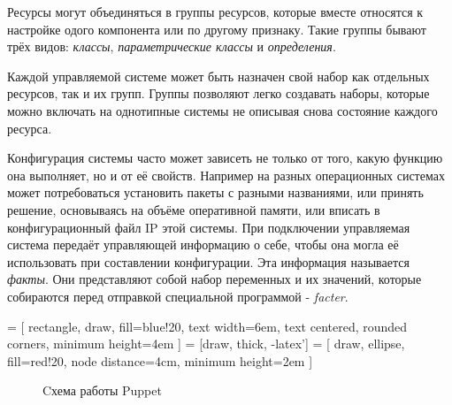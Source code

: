 Ресурсы могут объединяться в группы ресурсов, которые вместе относятся к настройке одого компонента или по другому признаку. Такие группы бывают трёх видов: \emph{классы}, \emph{параметрические классы} и \emph{определения}.

Каждой управляемой системе может быть назначен свой набор как отдельных ресурсов, так и их групп. Группы позволяют легко создавать наборы, которые можно включать на однотипные системы не описывая снова состояние каждого ресурса.

Конфигурация системы часто может зависеть не только от того, какую функцию она выполняет, но и от её свойств. Например на разных операционных системах может потребоваться установить пакеты с разными названиями, или принять решение, основываясь на объёме оперативной памяти, или вписать в конфигурационный файл IP этой системы. При подключении управляемая система передаёт управляющей информацию о себе, чтобы она могла её использовать при составлении конфигурации. Эта информация называется \emph{факты}. Они представляют собой набор переменных и их значений, которые собираются перед отправкой специальной программой - \emph{facter}.

 = [
rectangle, draw, fill=blue!20, text width=6em,
text centered, rounded corners, minimum height=4em
]
 = [draw, thick, -latex']
 = [
draw, ellipse, fill=red!20,
node distance=4cm, minimum height=2em
]

\begin{figure}[!h]
\centering
{}
\caption{Cхема работы Puppet}
\label{fig:puppet_scheme}
\end{figure}

